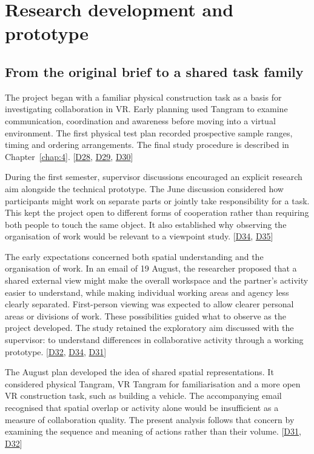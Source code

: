 \chapter{Research development and prototype}\label{chap:3}

\section{From the original brief to a shared task family}\label{sec:3-1}

The project began with a familiar physical construction task as a basis for investigating collaboration in VR. Early planning used Tangram to examine communication, coordination and awareness before moving into a virtual environment. The first physical test plan recorded prospective sample ranges, timing and ordering arrangements. The final study procedure is described in Chapter~\ref{chap:4}. [\hyperlink{src:D28}{D28}, \hyperlink{src:D29}{D29}, \hyperlink{src:D30}{D30}]

During the first semester, supervisor discussions encouraged an explicit research aim alongside the technical prototype. The June discussion considered how participants might work on separate parts or jointly take responsibility for a task. This kept the project open to different forms of cooperation rather than requiring both people to touch the same object. It also established why observing the organisation of work would be relevant to a viewpoint study. [\hyperlink{src:D34}{D34}, \hyperlink{src:D35}{D35}]

The early expectations concerned both spatial understanding and the organisation of work. In an email of 19 August, the researcher proposed that a shared external view might make the overall workspace and the partner's activity easier to understand, while making individual working areas and agency less clearly separated. First-person viewing was expected to allow clearer personal areas or divisions of work. These possibilities guided what to observe as the project developed. The study retained the exploratory aim discussed with the supervisor: to understand differences in collaborative activity through a working prototype. [\hyperlink{src:D32}{D32}, \hyperlink{src:D34}{D34}, \hyperlink{src:D31}{D31}]

The August plan developed the idea of shared spatial representations. It considered physical Tangram, VR Tangram for familiarisation and a more open VR construction task, such as building a vehicle. The accompanying email recognised that spatial overlap or activity alone would be insufficient as a measure of collaboration quality. The present analysis follows that concern by examining the sequence and meaning of actions rather than their volume. [\hyperlink{src:D31}{D31}, \hyperlink{src:D32}{D32}]

